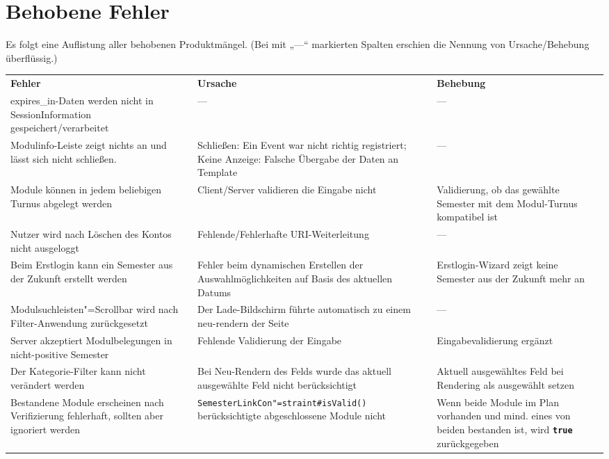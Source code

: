 \FloatBarrier
\section{Behobene Fehler}

Es folgt eine Auflistung aller behobenen Produktmängel. (Bei mit „---“ markierten Spalten erschien die Nennung von Ursache/Behebung überflüssig.)


\begin{longtable}{| >{\hspace{0pt}} p{} | >{\hspace{0pt}} p{} | >{\hspace{0pt}} p{} | }
	\hline
	\textbf{Fehler} & \textbf{Ursache}  & \textbf{Behebung} \\ 
	\hhline{|=|=|=|}
	\endfirsthead
	\endhead
	expires\_in-Daten werden nicht in SessionInformation gespeichert/verarbeitet & --- & --- \\
	\hline
	Modulinfo-Leiste zeigt nichts an und lässt sich nicht schließen. & Schließen: Ein Event war nicht richtig registriert; Keine Anzeige: Falsche Übergabe der Daten an Template & --- \\
	\hline
	Module können in jedem beliebigen Turnus abgelegt werden & Client/Server validieren die Eingabe nicht & Validierung, ob das gewählte Semester mit dem Modul-Turnus kompatibel ist \\
	\hline
	Nutzer wird nach Löschen des Kontos nicht ausgeloggt & Fehlende/Fehlerhafte URI-Weiterleitung & --- \\
	\hline
	Beim Erstlogin kann ein Semester aus der Zukunft erstellt werden & Fehler beim dynamischen Erstellen der Auswahlmöglichkeiten auf Basis des aktuellen Datums & Erstlogin-Wizard zeigt keine Semester aus der Zukunft mehr an \\
	\hline
	Modulsuchleisten"=Scrollbar wird nach Filter-Anwendung zurückgesetzt & Der Lade-Bildschirm führte automatisch zu einem neu-rendern der Seite & --- \\
	\hline
	Server akzeptiert Modulbelegungen in nicht-positive Semester & Fehlende Validierung der Eingabe & Eingabevalidierung ergänzt \\
	\hline
	Der Kategorie-Filter kann nicht verändert werden & Bei Neu-Rendern des Felds wurde das aktuell ausgewählte Feld nicht berücksichtigt & Aktuell ausgewähltes Feld bei Rendering als ausgewählt setzen \\
	\hline
	Bestandene Module erscheinen nach Verifizierung fehlerhaft, sollten aber ignoriert werden & \texttt{SemesterLinkCon"=straint\#isValid()} berücksichtigte abgeschlossene Module nicht & Wenn beide Module im Plan vorhanden und mind. eines von beiden bestanden ist, wird \texttt{\textbf{true}} zurückgegeben \\

\end{longtable}
